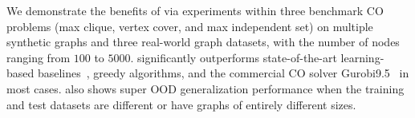 
We demonstrate the benefits of \proj via experiments within three benchmark CO problems (max clique, vertex cover, and max independent set) on multiple synthetic graphs and three real-world graph datasets, with the number of nodes ranging from $100$ to $5000$. \proj significantly outperforms state-of-the-art learning-based baselines~\citep{karalias2020erdos,toenshoff2021graph}, greedy algorithms, and the commercial CO solver Gurobi9.5~\citep{Gurobi} in most cases. \proj also shows super OOD generalization performance when the training and test datasets are different or have graphs of entirely different sizes.   %



